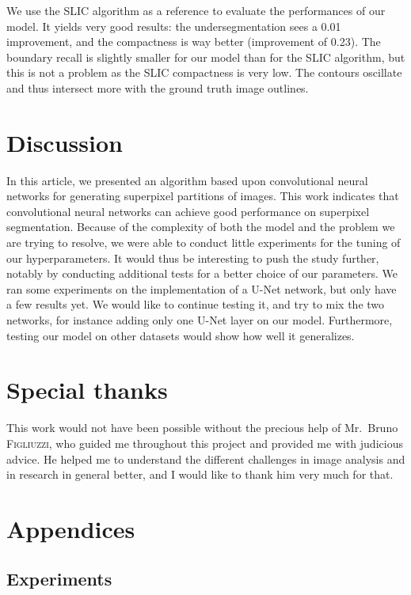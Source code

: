 \documentclass{article}
\begin{document}
        \par
        We use the SLIC algorithm as a reference to evaluate the performances of our model. It yields very good results: the undersegmentation sees a 0.01 improvement, and the compactness is way better (improvement of 0.23). The boundary recall is slightly smaller for our model than for the SLIC algorithm, but this is not a problem as the SLIC compactness is very low. The contours oscillate and thus intersect more with the ground truth image outlines.


\section{Discussion}
    In this article, we presented an algorithm based upon convolutional neural networks for generating superpixel partitions of images. This work indicates that convolutional neural networks can achieve good performance on superpixel segmentation. Because of the complexity of both the model and the problem we are trying to resolve, we were able to conduct little experiments for the tuning of our hyperparameters. It would thus be interesting to push the study further, notably by conducting additional tests for a better choice of our parameters. We ran some experiments on the implementation of a U-Net network, but only have a few results yet. We would like to continue testing it, and try to mix the two networks, for instance adding only one U-Net layer on our model. Furthermore, testing our model on other datasets would show how well it generalizes.


\newpage
\section*{Special thanks}
This work would not have been possible without the precious help of Mr.~Bruno \textsc{Figliuzzi}, who guided me throughout this project and provided me with judicious advice. He helped me to understand the different challenges in image analysis and in research in general better, and I would like to thank him very much for that.




\newpage
\section*{Appendices}

    \subsection*{Experiments}
    \cite{todo-experiments}
\end{document}
